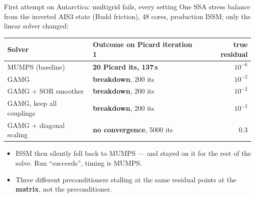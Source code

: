 \documentclass[10pt,aspectratio=169]{beamer}
\newcommand{\good}[1]{\textcolor{green!55!black}{\textbf{#1}}}
\newcommand{\bad}[1]{\textcolor{red!70!black}{\textbf{#1}}}
\begin{document}
\begin{frame}{First attempt on Antarctica: multigrid fails, every setting}
  One SSA stress balance from the inverted AIS3 state (Budd friction),
  48 cores, production ISSM; only the linear solver changed:
  \begin{center}
  \small
  \begin{tabular}{llr}
    \toprule
    Solver & Outcome on Picard iteration 1 & true residual \\
    \midrule
    MUMPS (baseline)           & \good{20 Picard its, 137\,s} & $10^{-6}$ \\
    GAMG                       & \bad{breakdown}, 200 its     & $10^{-2}$ \\
    GAMG + SOR smoother        & \bad{breakdown}, 200 its     & $10^{-2}$ \\
    GAMG, keep all couplings   & \bad{breakdown}, 200 its     & $10^{-2}$ \\
    GAMG + diagonal scaling    & \bad{no convergence}, 5000 its & 0.3 \\
    \bottomrule
  \end{tabular}
  \end{center}
  \begin{itemize}
    \item ISSM then silently fell back to MUMPS --- and \alert{stayed on it} for the
          rest of the solve. Run ``succeeds'', timing is MUMPS.
    \item Three different preconditioners stalling at the same residual points at
          the \textbf{matrix}, not the preconditioner.
  \end{itemize}
\end{frame}
\end{document}
